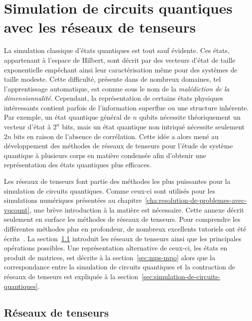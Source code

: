 \chapter{Simulation de circuits quantiques avec les réseaux de tenseurs}
\label{ann:simulation-circuits-quantiques-avec-reseaux-de-tenseurs}

La simulation classique d'états quantiques est tout sauf évidente. Ces états, appartenant à l'espace de Hilbert, sont décrit par des vecteurs d'état de taille exponentielle empêchant ainsi leur caractérisation même pour des systèmes de taille modeste. Cette difficulté, présente dans de nombreux domaines, tel l'apprentissage automatique, est connue sous le nom de la \textit{malédiction de la dimensionnalité}. Cependant, la représentation de certains états physiques intéressants contient parfois de l'information superflue ou une structure inhérente. Par exemple, un état quantique général de $n$ qubits nécessite théoriquement un vecteur d'état à $2^{n}$ bits, mais un état quantique non intriqué nécessite seulement $2n$ bits en raison de l'absence de corrélation. Cette idée a alors mené au développement des méthodes de réseaux de tenseurs pour l'étude de système quantique à plusieurs corps en matière condensée afin d'obtenir une représentation des états quantiques plus efficaces.

Les réseaux de tenseurs font partie des méthodes les plus puissantes pour la simulation de circuits quantiques. Comme ceux-ci sont utilisés pour les simulations numériques présentées au chapitre~\ref{cha:resolution-de-problemes-avec-vqcount}, une brève introduction à la matière est nécessaire. Cette annexe décrit seulement en surface les méthodes de réseaux de tenseurs. Pour comprendre les différentes méthodes plus en profondeur, de nombreux excellents tutoriels ont été écrits~\cite{bridgemanHandwavingInterpretiveDance2017,biamonteTensorNetworksNutshell2017,bakerMethodesCalculAvec2021}. La section~\ref{sec:reseaux-de-tenseurs} introduit les réseaux de tenseurs ainsi que les principales opérations possibles. Une représentation alternative de ceux-ci, les états en produit de matrices, est décrite à la section~\ref{sec:mps-mpo} alors que la correspondance entre la simulation de circuits quantiques et la contraction de réseaux de tenseurs est expliquée à la section~\ref{sec:simulation-de-circuits-quantiques}.


\section{Réseaux de tenseurs}
\label{sec:reseaux-de-tenseurs}

